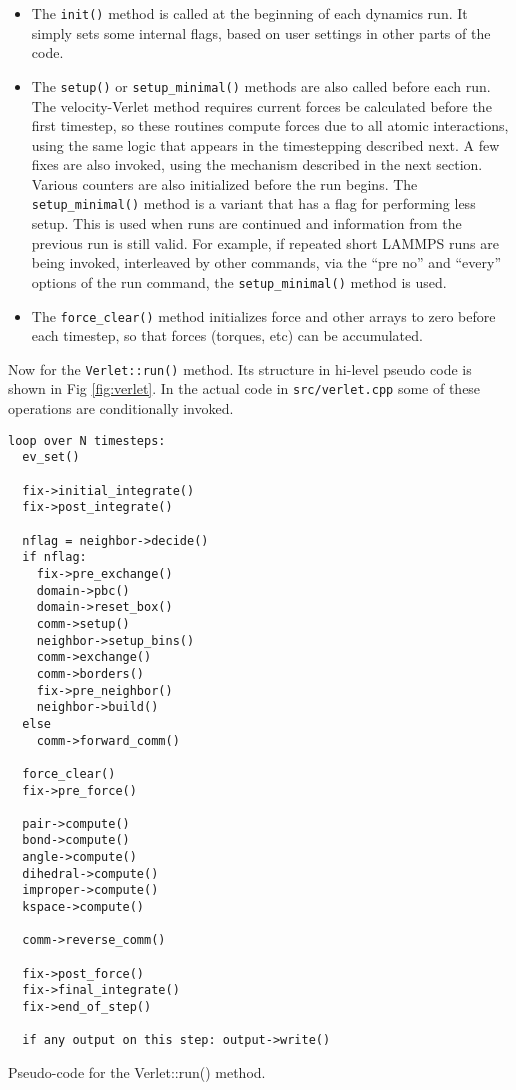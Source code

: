 \documentclass{article}
\newcommand{\path}[1]{{\color{gray}\texttt{#1}}}
\newcommand{\code}[1]{{\color{cadetblue}\texttt{#1}}}
\begin{document}
\begin{itemize}

\item The \code{init()} method is called at the beginning of each dynamics
  run.  It simply sets some internal flags, based on user settings in
  other parts of the code.

\item The \code{setup()} or \code{setup\_minimal()} methods are also called before
  each run.  The velocity-Verlet method requires current forces be
  calculated before the first timestep, so these routines compute
  forces due to all atomic interactions, using the same logic that
  appears in the timestepping described next.  A few fixes are also
  invoked, using the mechanism described in the next section.  Various
  counters are also initialized before the run begins.  The
  \code{setup\_minimal()} method is a variant that has a flag for performing
  less setup.  This is used when runs are continued and information
  from the previous run is still valid.  For example, if repeated
  short LAMMPS runs are being invoked, interleaved by other commands,
  via the ``pre no'' and ``every'' options of the run command, the
  \code{setup\_minimal()} method is used.

\item The \code{force\_clear()} method initializes force and other arrays to
  zero before each timestep, so that forces (torques, etc) can be
  accumulated.

\end{itemize}

Now for the \code{Verlet::run()} method.  Its structure in hi-level pseudo
code is shown in Fig \ref{fig:verlet}.  In the actual code in
\path{src/verlet.cpp} some of these operations are conditionally invoked.

\begin{listing}[htb]
 \begin{center}
 \begin{verbatim}
loop over N timesteps:
  ev_set()

  fix->initial_integrate()
  fix->post_integrate()

  nflag = neighbor->decide()
  if nflag:
    fix->pre_exchange()
    domain->pbc()
    domain->reset_box()
    comm->setup()
    neighbor->setup_bins()
    comm->exchange()
    comm->borders()
    fix->pre_neighbor()
    neighbor->build()
  else
    comm->forward_comm()

  force_clear()
  fix->pre_force()

  pair->compute()
  bond->compute()
  angle->compute()
  dihedral->compute()
  improper->compute()
  kspace->compute()

  comm->reverse_comm()

  fix->post_force()
  fix->final_integrate()
  fix->end_of_step()

  if any output on this step: output->write()
  \end{verbatim}
 \end{center}
 \caption{Pseudo-code for the Verlet::run() method.}
\label{fig:verlet}
\end{listing}
\end{document}
